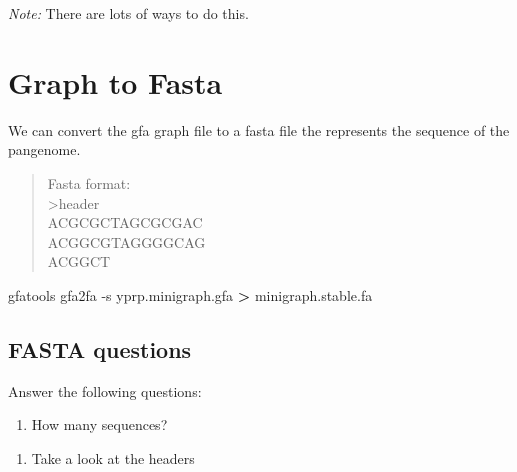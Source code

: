 \documentclass[
]{book}
\newenvironment{Shaded}{\begin{snugshade}}{\end{snugshade}}
\newcommand{\AttributeTok}[1]{\textcolor[rgb]{0.77,0.63,0.00}{#1}}
\newcommand{\ExtensionTok}[1]{#1}
\newcommand{\NormalTok}[1]{#1}
\newcommand{\OperatorTok}[1]{\textcolor[rgb]{0.81,0.36,0.00}{\textbf{#1}}}
\providecommand{\tightlist}{%
  \setlength{\itemsep}{0pt}\setlength{\parskip}{0pt}}
\begin{document}
\emph{Note:} There are lots of ways to do this.

\hypertarget{graph-to-fasta}{%
\section{Graph to Fasta}\label{graph-to-fasta}}

We can convert the gfa graph file to a fasta file the represents the sequence of the pangenome.

\begin{quote}
Fasta format:\\
\textgreater header\\
ACGCGCTAGCGCGAC\\
ACGGCGTAGGGGCAG\\
ACGGCT
\end{quote}

\begin{Shaded}
\begin{Highlighting}[]
\ExtensionTok{gfatools}\NormalTok{ gfa2fa }\AttributeTok{{-}s}\NormalTok{ yprp.minigraph.gfa }\OperatorTok{\textgreater{}}\NormalTok{ minigraph.stable.fa}
\end{Highlighting}
\end{Shaded}

\hypertarget{fasta-questions}{%
\subsection*{FASTA questions}\label{fasta-questions}}

Answer the following questions:

\begin{enumerate}
\def\labelenumi{\arabic{enumi}.}
\tightlist
\item
  How many sequences?
\end{enumerate}

\begin{Shaded}
\begin{Highlighting}[]

\end{Highlighting}
\end{Shaded}

\begin{enumerate}
\def\labelenumi{\arabic{enumi}.}
\setcounter{enumi}{1}
\tightlist
\item
  Take a look at the headers
\end{enumerate}
\end{document}
